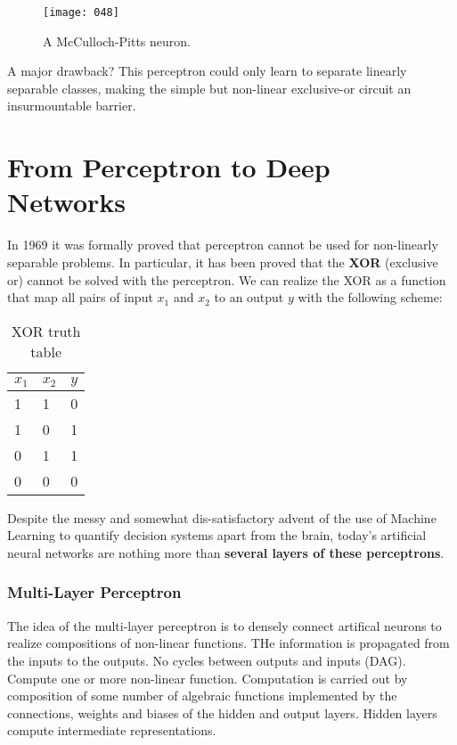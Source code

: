 \begin{figure}[h]
    \centering
    \texttt{[image: 048]}
    \caption{A McCulloch-Pitts neuron.}
\end{figure}

A major drawback? This perceptron could only learn to separate linearly separable classes, making the simple but non-linear exclusive-or circuit an insurmountable barrier.

\section{From Perceptron to Deep Networks}
In 1969 it was formally proved that perceptron cannot be used for non-linearly separable problems. In particular, it has been proved that the \textbf{XOR} (exclusive or) cannot be solved with the perceptron. We can realize the XOR as a function that map all pairs of input \(x_1\) and \(x_2\) to an output \(y\) with the following scheme:
\begin{table}[h!]
\begin{center}
\begin{tabular}{|p{0.8cm}|p{1.2cm}|p{1.2cm}|}
    \hline
    \(x_1\) & \(x_2\) & \(y\) \\
    \hline
    1 & 1 & 0 \\
    \hline
    1 & 0 & 1 \\
    \hline
    0 & 1 & 1 \\
    \hline
    0 & 0 & 0 \\
    \hline
\end{tabular}
\end{center}
\caption{XOR truth table}
\end{table} 

Despite the messy and somewhat dis-satisfactory advent of the use of Machine Learning to quantify decision systems apart from the brain, today's artificial neural networks are nothing more than \textbf{several layers of these perceptrons}.

\subsubsection{Multi-Layer Perceptron}
The idea of the multi-layer perceptron is to densely connect artifical neurons to realize compositions of non-linear functions. THe information is propagated from the inputs to the outputs. No cycles between outputs and inputs (DAG). Compute one or more non-linear function. Computation is carried out by composition of some number of algebraic functions implemented by the connections, weights and biases of the hidden and output layers. Hidden layers compute intermediate representations.

